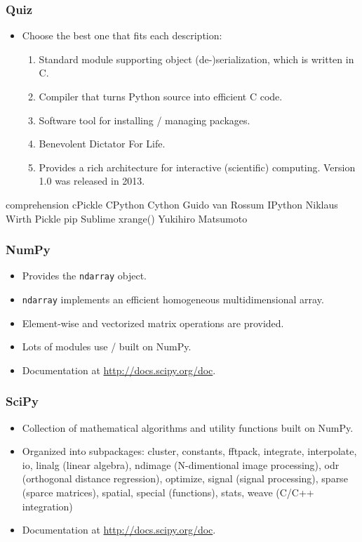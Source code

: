 \documentclass{beamer}
\begin{document}
\begin{frame}[fragile]
\frametitle{Quiz}
\begin{itemize}
\item Choose the best one that fits each description:
\begin{enumerate}
\item Standard module supporting object (de-)serialization,
      which is written in C.
\item Compiler that turns Python source into efficient
      C code.
\item Software tool for installing / managing packages.
\item Benevolent Dictator For Life.
\item Provides a rich architecture for interactive (scientific) 
      computing. Version 1.0 was released in 2013.  
\end{enumerate}
\end{itemize}
\begin{tcolorbox}
          comprehension cPickle CPython Cython
          Guido van Rossum IPython Niklaus Wirth
          Pickle pip Sublime xrange()
          Yukihiro Matsumoto
\end{tcolorbox} 
\end{frame}

\begin{frame}[fragile]
\frametitle{NumPy}
\begin{itemize}
\item Provides the \lstinline{ndarray} object.
\item \lstinline{ndarray} implements an efficient
      homogeneous multidimensional array.
\item Element-wise and vectorized matrix operations
      are provided.
\item Lots of modules use / built on NumPy.
\item Documentation at \url{http://docs.scipy.org/doc}.
\end{itemize}
\end{frame}

\begin{frame}[fragile]
\frametitle{SciPy}
\begin{itemize}
\item Collection of mathematical algorithms and
      utility functions built on NumPy.
\item Organized into subpackages: cluster,
      constants, fftpack, integrate, interpolate, io, 
      linalg (linear algebra), ndimage (N-dimentional
      image processing), odr (orthogonal distance regression),
      optimize, signal (signal processing), 
      sparse (sparce matrices), spatial, special
      (functions), stats, weave (C/C++ integration)
\item Documentation at \url{http://docs.scipy.org/doc}.
\end{itemize}
\end{frame}
\end{document}
